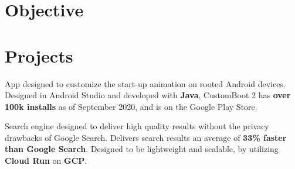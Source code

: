 \documentclass[letterpaper]{deedy-resume} %
\begin{document}
\begin{minipage}[t]{0.66\textwidth} %



\section{Objective}

\sectionspace %







\section{Projects}


App designed to customize the start-up animation on rooted Android devices. Designed in Android Studio and developed with \textbf{Java}, CustomBoot 2 has \textbf{over 100k installs} as of September 2020, and is on the Google Play Store.

\sectionspace %

Search engine designed to deliver high quality results without the privacy drawbacks of Google Search. Delivers search results an average of \textbf{33\% faster than Google Search}. Designed to be lightweight and scalable, by utilizing \textbf{Cloud Run} on \textbf{GCP}.




\end{minipage}
\end{document}
